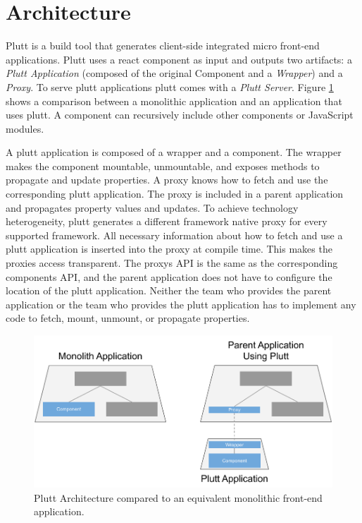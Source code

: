 \section{Architecture}


Plutt is a build tool that generates client-side integrated micro front-end applications. Plutt uses a react component as input and outputs two artifacts: a \textit{Plutt Application} (composed of the original Component and a \textit{Wrapper}) and a \textit{Proxy}. To serve plutt applications plutt comes with a \textit{Plutt Server}. Figure \ref{fig:plutt-architecture} shows a comparison between a monolithic application and an application that uses plutt. A component can recursively include other components or JavaScript modules.

A plutt application is composed of a wrapper and a component. The wrapper makes the component mountable, unmountable, and exposes methods to propagate and update properties. A proxy knows how to fetch and use the corresponding plutt application. The proxy is included in a parent application and propagates property values and updates. To achieve technology heterogeneity, plutt generates a different framework native proxy for every supported framework. All necessary information about how to fetch and use a plutt application is inserted into the proxy at compile time. This makes the proxies access transparent. The proxys API is the same as the corresponding components API, and the parent application does not have to configure the location of the plutt application. Neither the team who provides the parent application or the team who provides the plutt application has to implement any code to fetch, mount, unmount, or propagate properties.

\begin{figure}
    \centering
    \includegraphics[width=\linewidth]{images/plutt-architecture.pdf}
    \caption{Plutt Architecture compared to an equivalent monolithic front-end application.}
    \label{fig:plutt-architecture}
\end{figure}

